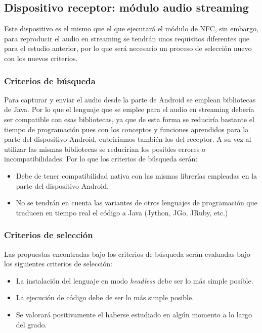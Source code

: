 \subsection{Dispositivo receptor: módulo audio streaming} \label{seleccion-streaming-receptor}

Este dispositivo es el mismo que el que ejecutará el módulo de NFC, sin embargo,
para reproducir el audio en streaming se tendrán unos requisitos diferentes que
para el estudio anterior, por lo que será necesario un proceso de selección
nuevo con los nuevos criterios.

\subsubsection{Criterios de búsqueda}

Para capturar y enviar el audio desde la parte de Android se emplean bibliotecas
de Java. Por lo que el lenguaje que se emplee para el audio en streaming debería
ser compatible con esas bibliotecas, ya que de esta forma se reduciría bastante
el tiempo de programación pues con los conceptos y funciones aprendidos para la
parte del dispositivo Android, cubriríamos también los del receptor. A su vez al
utilizar las mismas bibliotecas se reducirían los posibles errores o
incompatibilidades. Por lo que los criterios de búsqueda serán:

\begin{itemize}
    \item Debe de tener compatibilidad nativa con las mismas librerías empleadas
    en la parte del dispositivo Android.
    \item No se tendrán en cuenta las variantes de otros lenguajes de
    programación que traducen en tiempo real el código a Java (Jython, JGo,
    JRuby, etc.)
\end{itemize}

\subsubsection{Criterios de selección}

Las propuestas encontradas bajo los criterios de búsqueda serán evaluadas bajo
los siguientes criterios de selección:

\begin{itemize}
    \item La instalación del lenguaje en modo \emph{headless} debe ser lo más simple posible.
    \item La ejecución de código debe de ser lo más simple posible.
    \item Se valorará positivamente el haberse estudiado en algún momento a lo largo del grado.
\end{itemize}

